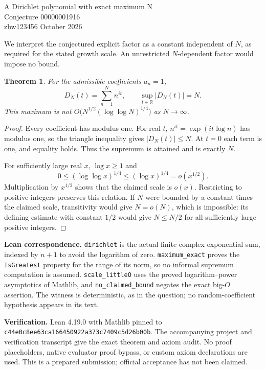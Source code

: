 \documentclass[11pt]{article}
\newtheorem{theorem}{Theorem}
\begin{document}
\begin{center}{\Large A Dirichlet polynomial with exact maximum N}\\[5pt]{\large Conjecture 00000001916}\\[5pt]zbw123456  October 2026\end{center}

We interpret the conjectured explicit factor as a constant independent of $N$, as required for the stated growth scale. An unrestricted $N$-dependent factor would impose no bound.
\begin{theorem}
For the admissible coefficients $a_n=1$,
\[
 D_N(t)=\sum_{n=1}^N n^{it},\qquad \sup_{t\in\mathbb R}|D_N(t)|=N.
\]
This maximum is not $O\bigl(N^{1/2}(\log\log N)^{1/4}\bigr)$ as $N\to\infty$.
\end{theorem}
\begin{proof}
Every coefficient has modulus one. For real $t$, $n^{it}=\exp(it\log n)$ has modulus one, so the triangle inequality gives $|D_N(t)|\le N$. At $t=0$ each term is one, and equality holds. Thus the supremum is attained and is exactly $N$.

For sufficiently large real $x$, $\log x\ge1$ and
\[
0\le(\log\log x)^{1/4}\le(\log x)^{1/4}=o(x^{1/2}).
\]
Multiplication by $x^{1/2}$ shows that the claimed scale is $o(x)$. Restricting to positive integers preserves this relation. If $N$ were bounded by a constant times the claimed scale, transitivity would give $N=o(N)$, which is impossible: its defining estimate with constant $1/2$ would give $N\le N/2$ for all sufficiently large positive integers.
\end{proof}
\textbf{Lean correspondence.} \texttt{dirichlet} is the actual finite complex exponential sum, indexed by $n+1$ to avoid the logarithm of zero. \texttt{maximum\_exact} proves the \texttt{IsGreatest} property for the range of its norm, so no informal supremum computation is assumed. \texttt{scale\_littleO} uses the proved logarithm--power asymptotics of Mathlib, and \texttt{no\_claimed\_bound} negates the exact big-$O$ assertion. The witness is deterministic, as in the question; no random-coefficient hypothesis appears in its text.


\textbf{Verification.} Lean 4.19.0 with Mathlib pinned to
\texttt{c44e0c8ee63ca166450922a373c7409c5d26b00b}.
The accompanying project and verification transcript give the exact theorem and axiom audit. No proof placeholders, native evaluator proof bypass, or custom axiom declarations are used. This is a prepared submission; official acceptance has not been claimed.
\end{document}
